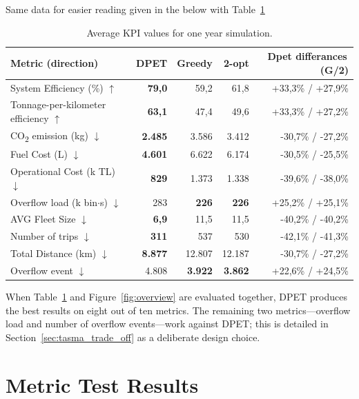 \documentclass[12pt,a4paper]{report}
\begin{document}
\begin{itemize}[leftmargin=*]
\indent Same data for easier reading given in the below with Table~\ref{tab:kpi_avg}
\begin{table}[H]
\centering
\caption{Average KPI values for one year simulation.}
\label{tab:kpi_avg}
\small
\begin{tabular}{lrrrr}
\toprule
\textbf{Metric (direction)} & \textbf{DPET} & \textbf{Greedy} & \textbf{2-opt} & \textbf{Dpet differances\,(G/2)} \\
\midrule
System Efficiency (\%) \(\uparrow\)        & \textbf{79,0}  & 59,2  & 61,8  & +33,3\% / +27,9\% \\
Tonnage-per-kilometer efficiency \(\uparrow\)             & \textbf{63,1}  & 47,4  & 49,6  & +33,3\% / +27,2\% \\
CO\textsubscript{2} emission (kg) \(\downarrow\)& \textbf{2.485} & 3.586 & 3.412 & -30,7\% / -27,2\% \\
Fuel Cost (L) \(\downarrow\)          & \textbf{4.601} & 6.622 & 6.174 & -30,5\% / -25,5\% \\
Operational Cost (k TL) \(\downarrow\)   & \textbf{829}   & 1.373 & 1.338 & -39,6\% / -38,0\% \\
Overflow load  (k bin\(\cdot\)s) \(\downarrow\) & 283            & \textbf{226}   & \textbf{226}   & +25,2\% / +25,1\% \\
AVG Fleet Size \(\downarrow\)          & \textbf{6,9}   & 11,5  & 11,5  & -40,2\% / -40,2\% \\
Number of trips \(\downarrow\)                 & \textbf{311}   & 537   & 530   & -42,1\% / -41,3\% \\
Total Distance (km) \(\downarrow\)              & \textbf{8.877} & 12.807 & 12.187 & -30,7\% / -27,2\% \\
Overflow event \(\downarrow\)            & 4.808          & \textbf{3.922} & \textbf{3.862} & +22,6\% / +24,5\% \\
\bottomrule
\end{tabular}
\end{table}

\indent When Table~\ref{tab:kpi_avg} and Figure~\ref{fig:overview} are evaluated together, DPET produces the best results on eight out of ten metrics. The remaining two metrics—overflow load and number of overflow events—work against DPET; this is detailed in Section~\ref{sec:tasma_trade_off} as a deliberate design choice.

\section{Metric Test Results}
\label{sec:detayli_metrik}


\end{itemize}
\end{document}
